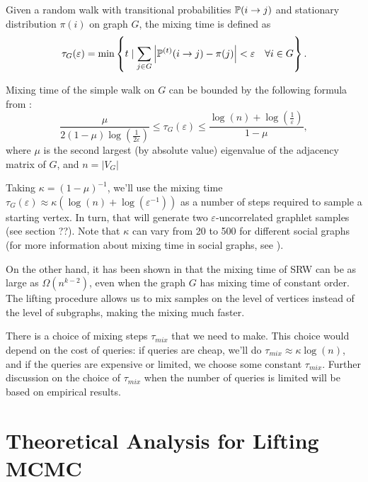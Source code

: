 	\begin{definition}
		Given a random walk with transitional probabilities $\P(i\rightarrow j)$ and 
		stationary distribution $\pi(i)$ on graph $G$, the mixing time is defined as
		\begin{equation*}
			\tau_G(\varepsilon) = 
			\min\left\{t \mid 
			\sum_{j\in G} \left\vert \P^{(t)}(i\rightarrow j) - \pi(j)\right\vert
			<\varepsilon \quad \forall i\in G\right\}.
		\end{equation*}
	\end{definition}
	
	Mixing time of the simple walk on $G$ can be bounded by the following formula from \cite{Sinclair1992}:
	\begin{equation*}
		\frac{\mu}{2(1-\mu) \log(\frac{1}{2\varepsilon})} \leq
		\tau_G(\varepsilon) \leq
		\frac{\log(n) + \log(\frac{1}{\varepsilon})}{1-\mu},
	\end{equation*}
	where $\mu$ is the second largest (by absolute value) eigenvalue of the adjacency matrix 
	of $G$, and $n=|V_G|$
	
	Taking $\kappa  = (1-\mu)^{-1}$, we'll use the mixing time $\tau_G(\varepsilon) \approx \kappa(\log(n)+\log(\varepsilon^{-1}))$ as a number of steps required to sample a starting vertex.
	In turn, that will generate two $\varepsilon$-uncorrelated graphlet samples (see section ??).
	Note that $\kappa$ can vary from 20 to 500 for different social graphs (for more information about mixing time in social graphs, see \cite{Mohaisen2010mixingtime}).
	
	On the other hand, it has been shown in \cite{Bressan2017colourcoding} that the mixing time of SRW can be as large as $\Omega(n^{k-2})$, even when the graph $G$ has mixing time of constant order.
	The lifting procedure allows us to mix samples on the level of vertices instead of the level of subgraphs, making the mixing much faster.

	There is a choice of mixing steps $\tau_{mix}$ that we need to make.
	This choice would depend on the cost of queries: if queries are cheap, we'll do 
	$\tau_{mix} \approx \kappa\log(n)$, and if the queries are expensive or limited, 
	we choose some constant $\tau_{mix}$.
	Further discussion on the choice of $\tau_{mix}$ when the number of queries is limited 
	will be based on empirical results.

\section{Theoretical Analysis for Lifting MCMC}

